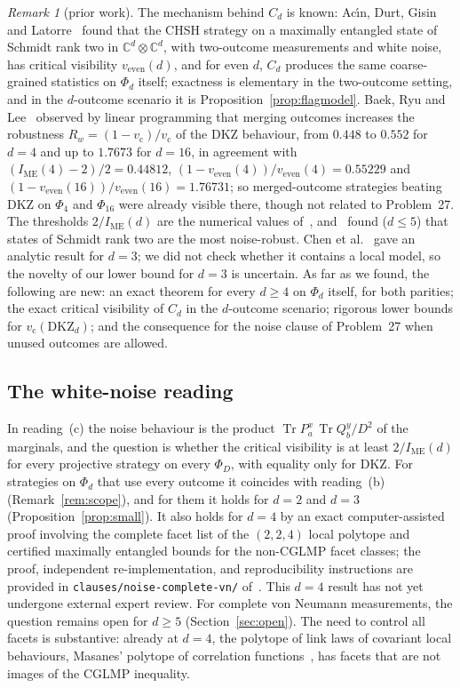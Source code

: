 \documentclass[11pt]{article}
\theoremstyle{remark}
\newtheorem{remark}[lemma]{Remark}
\numberwithin{equation}{section}
\newcommand{\C}{\mathbb{C}}
\newcommand{\Tr}{\operatorname{Tr}}
\newcommand{\IME}{I_{\mathrm{ME}}}
\newcommand{\vc}{v_{\mathrm c}}
\newcommand{\veven}{v_{\mathrm{even}}}
\newcommand{\DKZ}{\mathrm{DKZ}}
\begin{document}
\begin{remark}[prior work]\label{rem:literalcredit}
The mechanism behind $C_d$ is known: Ac\'{\i}n, Durt, Gisin and Latorre~\cite[eq.~(14)]{ADGL} found that the CHSH
strategy on a maximally entangled state of Schmidt rank two in $\C^d\otimes\C^d$, with two-outcome measurements and white
noise, has critical visibility $\veven(d)$, and for even $d$, $C_d$ produces the same coarse-grained statistics on
$\Phi_d$ itself; exactness is elementary in the two-outcome setting, and in the $d$-outcome scenario it is
Proposition~\ref{prop:flagmodel}. Baek, Ryu and Lee~\cite{BRL} observed by linear programming that merging outcomes
increases the robustness $R_w=(1-\vc)/\vc$ of the DKZ behaviour, from $0.448$ to $0.552$ for $d=4$ and up to $1.7673$
for $d=16$, in agreement with $(\IME(4)-2)/2=0.44812$, $(1-\veven(4))/\veven(4)=0.55229$ and
$(1-\veven(16))/\veven(16)=1.76731$; so merged-outcome strategies beating DKZ on
$\Phi_4$ and $\Phi_{16}$ were already visible there, though not related to Problem~27. The thresholds $2/\IME(d)$ are the
numerical values of~\cite{KGZMZ,DKZ,CGLMP,GLZ}, and~\cite{GLZ} found ($d\le5$) that states of Schmidt rank two are the
most noise-robust. Chen et al.~\cite{Chen01} gave an analytic result for $d=3$; we did not check whether it contains a local model, so the novelty of our lower bound for
$d=3$ is uncertain. As far as we found, the following are new: an exact theorem for every $d\ge4$ on $\Phi_d$ itself,
for both parities; the exact critical visibility of $C_d$ in the $d$-outcome scenario; rigorous lower bounds for
$\vc(\DKZ_d)$; and the consequence for the noise clause of Problem~27 when unused outcomes are allowed.
\end{remark}

\subsection{The white-noise reading}\label{subsec:white}
In reading~(c) the noise behaviour is the product $\Tr P^x_a\,\Tr Q^y_b/D^2$ of the marginals, and the question is
whether the critical visibility is at least $2/\IME(d)$ for every projective strategy on every $\Phi_D$, with equality
only for DKZ. For strategies on $\Phi_d$ that use every outcome it coincides with reading~(b) (Remark~\ref{rem:scope}), and
for them it holds for $d=2$ and $d=3$ (Proposition~\ref{prop:small}). It also holds for $d=4$ by an exact
computer-assisted proof involving the complete facet list of the $(2,2,4)$ local polytope and certified
maximally entangled bounds for the non-CGLMP facet classes; the proof, independent re-implementation,
and reproducibility instructions are provided in \texttt{clauses/noise-complete-vn/} of~\cite{repo}.
This $d=4$ result has not yet undergone external expert review. For complete von Neumann measurements,
the question remains open for $d\ge5$ (Section~\ref{sec:open}). The need to control all facets is
substantive: already at $d=4$, the polytope of link laws of covariant local behaviours, Masanes' polytope of
correlation functions~\cite{Masanes}, has facets that are not images of the CGLMP inequality.
\end{document}
